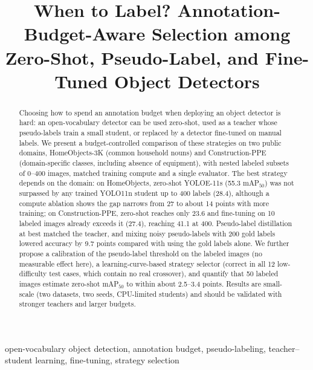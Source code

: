 \documentclass[conference]{IEEEtran}
\begin{document}
\title{When to Label? Annotation-Budget-Aware Selection among Zero-Shot, Pseudo-Label, and Fine-Tuned Object Detectors}

\author{
\IEEEauthorblockA{\textit{[Affiliation]}\\
{[email]}}}

\maketitle
\begin{abstract}
Choosing how to spend an annotation budget when deploying an object detector is hard: an open-vocabulary detector can be used zero-shot, used as a teacher whose pseudo-labels train a small student, or replaced by a detector fine-tuned on manual labels. We present a budget-controlled comparison of these strategies on two public domains, HomeObjects-3K (common household nouns) and Construction-PPE (domain-specific classes, including absence of equipment), with nested labeled subsets of 0--400 images, matched training compute and a single evaluator. The best strategy depends on the domain: on HomeObjects, zero-shot YOLOE-11s (55.3 mAP$_{50}$) was not surpassed by any trained YOLO11n student up to 400 labels (28.4), although a compute ablation shows the gap narrows from 27 to about 14 points with more training; on Construction-PPE, zero-shot reaches only 23.6 and fine-tuning on 10 labeled images already exceeds it (27.4), reaching 41.1 at 400. Pseudo-label distillation at best matched the teacher, and mixing noisy pseudo-labels with 200 gold labels lowered accuracy by 9.7 points compared with using the gold labels alone. We further propose a calibration of the pseudo-label threshold on the labeled images (no measurable effect here), a learning-curve-based strategy selector (correct in all 12 low-difficulty test cases, which contain no real crossover), and quantify that 50 labeled images estimate zero-shot mAP$_{50}$ to within about 2.5--3.4 points. Results are small-scale (two datasets, two seeds, CPU-limited students) and should be validated with stronger teachers and larger budgets.
\end{abstract}

\begin{IEEEkeywords}
open-vocabulary object detection, annotation budget, pseudo-labeling, teacher--student learning, fine-tuning, strategy selection
\end{IEEEkeywords}
\end{document}
